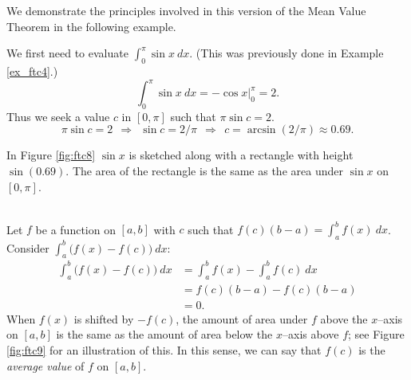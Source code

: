 We demonstrate the principles involved in this version of the Mean Value Theorem in the following example.\\

{We first need to evaluate $\int_0^\pi \sin x\ dx$. (This was previously done in Example \ref{ex_ftc4}.)
		$$\int_0^\pi\sin x\ dx =	-\cos x \Big|_0^\pi = 2.$$
Thus we seek a value $c$ in $[0,\pi]$ such that $\pi\sin c =2$. 
$$\pi\sin c = 2\ \ \Rightarrow\ \ \sin c = 2/\pi\ \ \Rightarrow\ \ c = \arcsin(2/\pi) \approx 0.69.$$

In Figure \ref{fig:ftc8} $\sin x$ is sketched along with a rectangle with height $\sin (0.69)$. The area of the rectangle is the same as the area under $\sin x$ on $[0,\pi]$.
}\\

Let $f$ be a function on $[a,b]$ with $c$ such that $f(c)(b-a) = \int_a^bf(x)\ dx$. Consider $\int_a^b\big(f(x)-f(c)\big)\ dx$:
\begin{align*}
	\int_a^b\big(f(x)-f(c)\big)\ dx &=	\int_a^b f(x) - \int_a^b f(c)\ dx\\
							&= f(c)(b-a) - f(c)(b-a) \\
							&= 0.
\end{align*}
When $f(x)$ is shifted by $-f(c)$, the amount of area under $f$ above the $x$--axis on $[a,b]$ is the same as the amount of area below the $x$--axis above $f$; see Figure \ref{fig:ftc9} for an illustration of this. In this sense, we can say that $f(c)$ is the \textit{average value} of $f$ on $[a,b]$. 

{%
{\hfill {}}
} %
{%
{\\ \noindent {}}
}%

